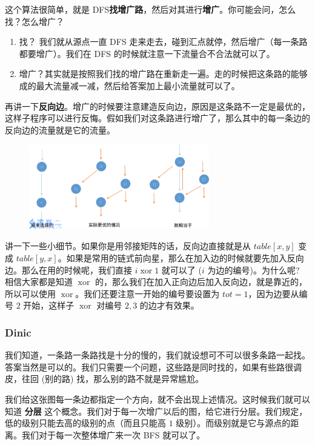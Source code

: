 这个算法很简单，就是 DFS\textbf{找增广路}，然后对其进行\textbf{增广}。你可能会问，怎么找？怎么增广？

\begin{enumerate}
\item 找？ 我们就从源点一直 DFS 走来走去，碰到汇点就停，然后增广（每一条路都要增广）。我们在 DFS 的时候就注意一下流量合不合法就可以了。
\item 增广？其实就是按照我们找的增广路在重新走一遍。走的时候把这条路的能够成的最大流量减一减，然后给答案加上最小流量就可以了。
\end{enumerate}

再讲一下\textbf{反向边}。增广的时候要注意建造反向边，原因是这条路不一定是最优的，这样子程序可以进行反悔。假如我们对这条路进行增广了，那么其中的每一条边的反向边的流量就是它的流量。

\begin{figure}[htbp]
\centering
\includegraphics[width=0.7\textwidth]{docs/graph/images/flow2.png} 

\end{figure}

讲一下一些小细节。如果你是用邻接矩阵的话，反向边直接就是从 $table[x,y]$ 变成 $table[y,x]$。如果是常用的链式前向星，那么在加入边的时候就要先加入反向边。那么在用的时候呢，我们直接 $i\operatorname{xor}1$ 就可以了 ($i$ 为边的编号)。为什么呢? 相信大家都是知道 $\operatorname{xor}$ 的，那么我们在加入正向边后加入反向边，就是靠近的，所以可以使用 $\operatorname{xor}$。我们还要注意一开始的编号要设置为 $tot=1$，因为边要从编号 $2$ 开始，这样子 $\operatorname{xor}$ 对编号 $2,3$ 的边才有效果。

\subsubsection{Dinic}

我们知道，一条路一条路找是十分的慢的，我们就设想可不可以很多条路一起找。答案当然是可以的。我们只需要一个问题，这些路是同时找的，如果有些路很调皮，往回 (别的路) 找，那么别的路不就是异常尴尬。

我们给这张图每一条边都指定一个方向，就不会出现上述情况。这时候我们就可以知道 \textbf{分层} 这个概念。我们对于每一次增广以后的图，给它进行分层。我们规定，低的级别只能去高的级别的点（而且只能高 $1$ 级别）。而级别就是它与源点的距离。我们对于每一次整体增广来一次 BFS 就可以了。

